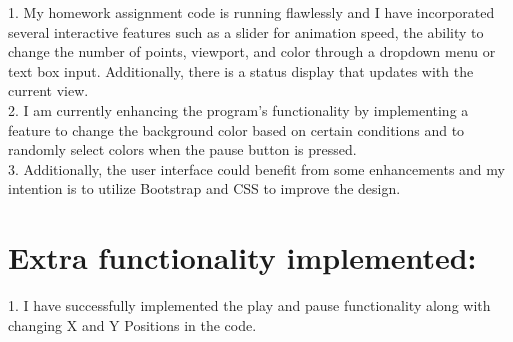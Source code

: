 \documentclass[12pt]{report}
\begin{document}
1.	My homework assignment code is running flawlessly and I have incorporated several interactive features such as a slider for animation speed, the ability to change the number of points, viewport, and color through a dropdown menu or text box input. Additionally, there is a status display that updates with the current view.\\
2.	I am currently enhancing the program's functionality by implementing a feature to change the background color based on certain conditions and to randomly select colors when the pause button is pressed.\\
3.	Additionally, the user interface could benefit from some enhancements and my intention is to utilize Bootstrap and CSS to improve the design.

\section{Extra functionality implemented:}

1.  I have successfully implemented the play and pause functionality along with changing X and Y Positions in the code.
\end{document}
